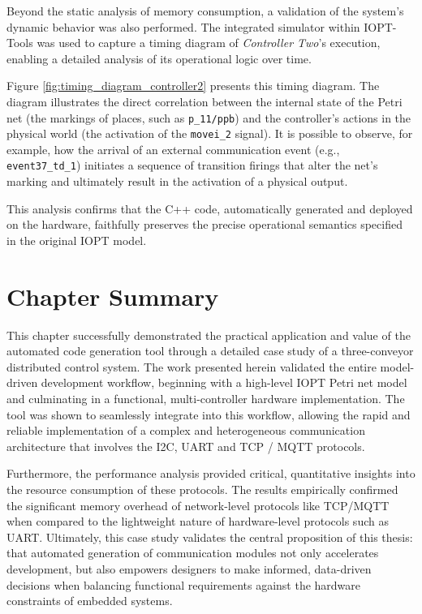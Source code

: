 Beyond the static analysis of memory consumption, a validation of the system's dynamic behavior was also performed. The integrated simulator within IOPT-Tools was used to capture a timing diagram of \textit{Controller Two}'s execution, enabling a detailed analysis of its operational logic over time.

Figure \ref{fig:timing_diagram_controller2} presents this timing diagram. The diagram illustrates the direct correlation between the internal state of the Petri net (the markings of places, such as \texttt{p\_11/ppb}) and the controller's actions in the physical world (the activation of the \texttt{movei\_2} signal). It is possible to observe, for example, how the arrival of an external communication event (e.g., \texttt{event37\_td\_1}) initiates a sequence of transition firings that alter the net's marking and ultimately result in the activation of a physical output.

This analysis confirms that the C++ code, automatically generated and deployed on the hardware, faithfully preserves the precise operational semantics specified in the original IOPT model.




\section{Chapter Summary}
\label{sec:case_study_summary}

This chapter successfully demonstrated the practical application and value of the automated code generation tool through a detailed case study of a three-conveyor distributed control system. The work presented herein validated the entire model-driven development workflow, beginning with a high-level IOPT Petri net model and culminating in a functional, multi-controller hardware implementation. The tool was shown to seamlessly integrate into this workflow, allowing the rapid and reliable implementation of a complex and heterogeneous communication architecture that involves the I2C, UART and TCP / MQTT protocols.

Furthermore, the performance analysis provided critical, quantitative insights into the resource consumption of these protocols. The results empirically confirmed the significant memory overhead of network-level protocols like TCP/MQTT when compared to the lightweight nature of hardware-level protocols such as UART. Ultimately, this case study validates the central proposition of this thesis: that automated generation of communication modules not only accelerates development, but also empowers designers to make informed, data-driven decisions when balancing functional requirements against the hardware constraints of embedded systems.